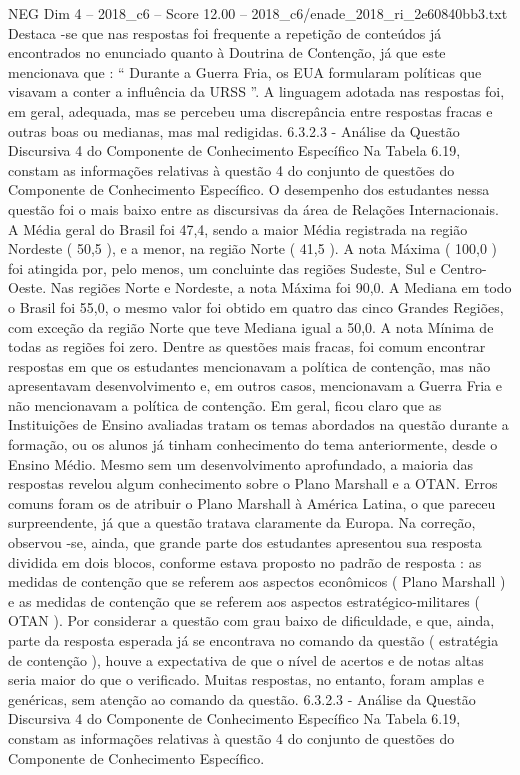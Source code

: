 \begin{textsample}{NEG Dim 4 – 2018\_c6 – Score 12.00 – 2018\_c6/enade\_2018\_ri\_2e60840bb3.txt}
Destaca -se que nas respostas foi frequente a repetição de conteúdos já encontrados no enunciado quanto à Doutrina de Contenção, já que este mencionava que : “ Durante a Guerra Fria, os EUA formularam políticas que visavam a conter a influência da URSS ”.
A linguagem adotada nas respostas foi, em geral, adequada, mas se percebeu uma discrepância entre respostas fracas e outras boas ou medianas, mas mal redigidas. 6.3.2.3 - Análise da Questão Discursiva 4 do Componente de Conhecimento Específico Na Tabela 6.19, constam as informações relativas à questão 4 do conjunto de questões do Componente de Conhecimento Específico.
O desempenho dos estudantes nessa questão foi o mais baixo entre as discursivas da área de Relações Internacionais.
A Média geral do Brasil foi 47,4, sendo a maior Média registrada na região Nordeste ( 50,5 ), e a menor, na região Norte ( 41,5 ).
A nota Máxima ( 100,0 ) foi atingida por, pelo menos, um concluinte das regiões Sudeste, Sul e Centro-Oeste.
Nas regiões Norte e Nordeste, a nota Máxima foi 90,0.
A Mediana em todo o Brasil foi 55,0, o mesmo valor foi obtido em quatro das cinco Grandes Regiões, com exceção da região Norte que teve Mediana igual a 50,0.
A nota Mínima de todas as regiões foi zero.
Dentre as questões mais fracas, foi comum encontrar respostas em que os estudantes mencionavam a política de contenção, mas não apresentavam desenvolvimento e, em outros casos, mencionavam a Guerra Fria e não mencionavam a política de contenção.
Em geral, ficou claro que as Instituições de Ensino avaliadas tratam os temas abordados na questão durante a formação, ou os alunos já tinham conhecimento do tema anteriormente, desde o Ensino Médio.
Mesmo sem um desenvolvimento aprofundado, a maioria das respostas revelou algum conhecimento sobre o Plano Marshall e a OTAN.
Erros comuns foram os de atribuir o Plano Marshall à América Latina, o que pareceu surpreendente, já que a questão tratava claramente da Europa.
Na correção, observou -se, ainda, que grande parte dos estudantes apresentou sua resposta dividida em dois blocos, conforme estava proposto no padrão de resposta : as medidas de contenção que se referem aos aspectos econômicos ( Plano Marshall ) e as medidas de contenção que se referem aos aspectos estratégico-militares ( OTAN ).
Por considerar a questão com grau baixo de dificuldade, e que, ainda, parte da resposta esperada já se encontrava no comando da questão ( estratégia de contenção ), houve a expectativa de que o nível de acertos e de notas altas seria maior do que o verificado.
Muitas respostas, no entanto, foram amplas e genéricas, sem atenção ao comando da questão. 6.3.2.3 - Análise da Questão Discursiva 4 do Componente de Conhecimento Específico Na Tabela 6.19, constam as informações relativas à questão 4 do conjunto de questões do Componente de Conhecimento Específico.

\end{textsample}
